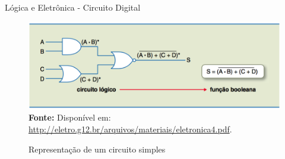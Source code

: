 \documentclass[aspectratio=169]{beamer}
\begin{document}
	\begin{frame}{Lógica e Eletrônica - Circuito Digital}
		\begin{figure}[h]
			\centering
			\caption{Representação de um circuito simples}
			\includegraphics[height=0.6\textheight]{img/ed/ed-circuito.png}
			\\
			{\footnotesize \textbf{Fonte:} Disponível em: \url{http://eletro.g12.br/arquivos/materiais/eletronica4.pdf}.}
			\label{fig:ed-circuito}
		\end{figure}
	\end{frame}
\end{document}
